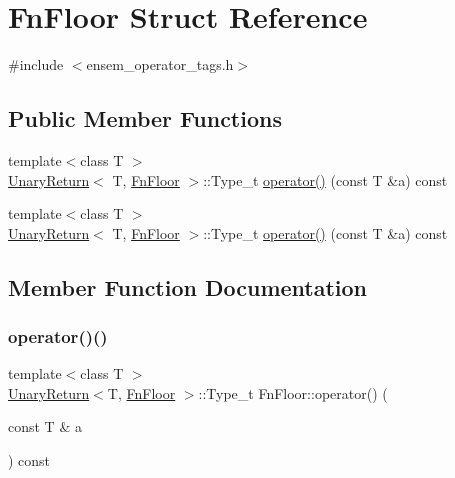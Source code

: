 \hypertarget{structFnFloor}{}\section{Fn\+Floor Struct Reference}
\label{structFnFloor}


{\ttfamily \#include $<$ensem\+\_\+operator\+\_\+tags.\+h$>$}

\subsection*{Public Member Functions}
\begin{DoxyCompactItemize}
\item 
{\footnotesize template$<$class T $>$ }\\\mbox{\hyperlink{structUnaryReturn}{Unary\+Return}}$<$ T, \mbox{\hyperlink{structFnFloor}{Fn\+Floor}} $>$\+::Type\+\_\+t \mbox{\hyperlink{structFnFloor_ab74b902d8ab286ae5ec2c6066140919b}{operator()}} (const T \&a) const
\item 
{\footnotesize template$<$class T $>$ }\\\mbox{\hyperlink{structUnaryReturn}{Unary\+Return}}$<$ T, \mbox{\hyperlink{structFnFloor}{Fn\+Floor}} $>$\+::Type\+\_\+t \mbox{\hyperlink{structFnFloor_ab74b902d8ab286ae5ec2c6066140919b}{operator()}} (const T \&a) const
\end{DoxyCompactItemize}


\subsection{Member Function Documentation}
\mbox{\label{structFnFloor_ab74b902d8ab286ae5ec2c6066140919b}} 
\subsubsection{\texorpdfstring{operator()()}{operator()()}\hspace{0.1cm}{\footnotesize\ttfamily [1/2]}}
{\footnotesize\ttfamily template$<$class T $>$ \\
\mbox{\hyperlink{structUnaryReturn}{Unary\+Return}}$<$T, \mbox{\hyperlink{structFnFloor}{Fn\+Floor}} $>$\+::Type\+\_\+t Fn\+Floor\+::operator() (\begin{DoxyParamCaption}\item[{const T \&}]{a }\end{DoxyParamCaption}) const\hspace{0.3cm}{\ttfamily [inline]}}

